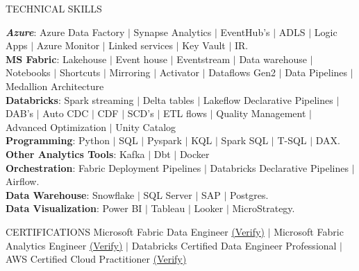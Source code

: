 \documentclass{resume} %
\begin{document}
\small
\vspace{-1em}
\begin{rSection}{TECHNICAL SKILLS}
\vspace{-1em}

\textit{\textbf{Azure}}: Azure Data Factory $|$ Synapse Analytics $|$ EventHub’s $|$ ADLS $|$ Logic Apps $|$ Azure Monitor $|$ Linked services $|$ Key Vault $|$ IR. \\
{\bf MS Fabric}: Lakehouse $|$ Event house $|$ Eventstream $|$ Data warehouse $|$ Notebooks $|$ Shortcuts $|$ Mirroring $|$ Activator $|$ Dataflows Gen2 $|$ Data Pipelines $|$ Medallion Architecture\\
{\bf Databricks}: Spark streaming $|$ Delta tables $|$ Lakeflow Declarative Pipelines $|$ DAB’s $|$ Auto CDC $|$ CDF $|$ SCD's $|$ ETL flows $|$ Quality Management $|$ Advanced Optimization $|$ Unity Catalog  \\
{\bf Programming}: Python $|$ SQL $|$ Pyspark $|$ KQL $|$ Spark SQL $|$ T-SQL $|$ DAX. \\
{\bf Other Analytics Tools}: Kafka $|$ Dbt $|$ Docker \\
{\bf Orchestration}: Fabric Deployment Pipelines $|$ Databricks Declarative Pipelines $|$ Airflow. \\
{\bf Data Warehouse}: Snowflake $|$ SQL Server $|$ SAP $|$ Postgres.\\
{\bf Data Visualization}: Power BI $|$ Tableau $|$ Looker $|$ MicroStrategy.\\
\end{rSection}

\vspace{-21pt}
\begin{rSection}{CERTIFICATIONS}
\vspace{-1em}
{{Microsoft Fabric Data Engineer} \href{https://learn.microsoft.com/en-us/users/chukkalavankumargoud-0967/credentials/343640923e3e2c2d?ref=https%3A%2F%2Fgithub.com%2F}{(Verify)} $|$ {Microsoft Fabric Analytics Engineer} \href{https://learn.microsoft.com/en-us/users/chukkalavankumargoud-0967/credentials/ad17a4a856dcc0ab?ref=https%3A%2F%2Fgithub.com%2F}{(Verify)} $|$ Databricks Certified Data Engineer Professional $|$ {AWS Certified Cloud Practitioner} \href{https://www.credly.com/badges/335e9c42-de0a-4215-803f-733e630c66d6?source=linked_in_profile%0A}{(Verify)} }
\end{rSection}
\end{document}
